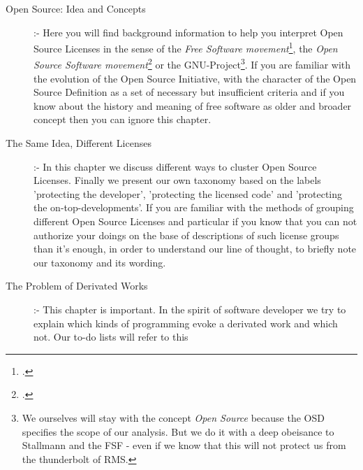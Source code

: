 \begin{description}
  \item[Open Source: Idea and Concepts] :- Here you will find background
  information to help you interpret Open Source Licenses in the sense of the
  \emph{Free Software movement}\footcite[At least at this place you are perhaps
  expecting that we use the logograms FLOSS, F/OSS, F/LOSS, or whatever. As you
  will read later on the word \textit{Free} is ambiguous and has strained the
  use of the concept \textit{Free Software}. Later on we will also talk about
  the invention of the concept \textit{Open Source} designed as a 'replacement'
  and acting as a 'splitter'. The mentioned logograms are introduced to
  re-establish or - at least - to underline the common history and the common
  center of 'both' movements, whereby the word \textit{Libre} shall resolve the
  ambiguity of the word \textit{Free}. For a first survey cf.] [\nopage
  wp.]{wpFloss2011a}, the \emph{Open Source Software movement}\footcite[For
  another brief and informative introduction cf.][231ff esp. p.
  232f.]{Fogel2006a} or the GNU-Project\footnote{ We ourselves will stay with the
  concept \textit{Open Source} because the OSD specifies the scope of our
  analysis. But we do it with a deep obeisance to Stallmann and the FSF - even
  if we know that this will not protect us from the thunderbolt of RMS.}. If
  you are familiar with the evolution of the Open Source Initiative, with the
  character of the Open Source Definition as a set of necessary but insufficient
  criteria and if you know about the history and meaning of free software as
  older and broader concept then you can ignore this chapter.
  \item[The Same Idea, Different Licenses] :- In this chapter we discuss
  different ways to cluster Open Source Licenses. Finally we present our own
  taxonomy based on the labels 'protecting the developer', 'protecting the
  licensed code' and 'protecting the on-top-developments'. If you are familiar
  with the methods of grouping different Open Source Licenses and particular
  if you know that you can not authorize your doings on the base of descriptions
  of such license groups than it's enough, in order to understand our line of
  thought, to briefly note our taxonomy and its wording.
  \item[The Problem of Derivated Works] :- This chapter is important. In the
  spirit of software developer we try to explain which kinds of programming
  evoke a derivated work and which not. Our to-do lists will refer to this

\end{description}
